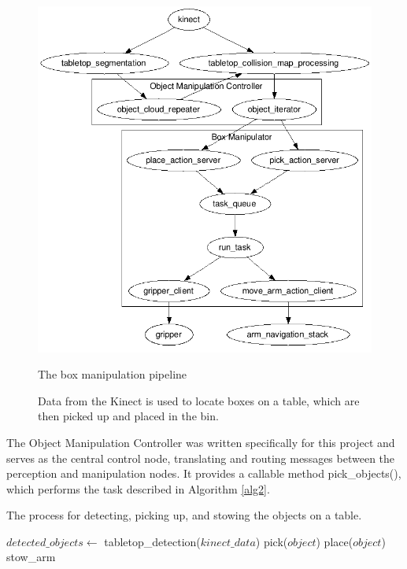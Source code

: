 \documentclass[]{cwru} %
\begin{document}
\begin{figure}[ht]
\centering
\includegraphics[width=6.0in]{box_manipulator_graph}
\caption{The box manipulation pipeline}
\caption*{Data from the Kinect is used to locate boxes on a table, which are 
then picked up and placed in the bin.}
\label{fig:box-manip}
\end{figure}

The Object Manipulation Controller was written specifically for this
project and serves as the central control node, translating and routing
messages between the perception and manipulation nodes. It provides a
callable method pick\_objects(), which performs the task described in
Algorithm \ref{alg2}.

\begin{algorithm}
\caption{The process for detecting, picking up, and stowing the objects
on a table.}
\label{alg2}
\begin{algorithmic}

\STATE $detected\_objects \gets$ tabletop\_detection($kinect\_data$)
    \STATE pick($object$)
    \STATE place($object$)
    \STATE stow\_arm
  \ENDIF
\ENDFOR
\end{algorithmic}
\end{algorithm}
\end{document}
